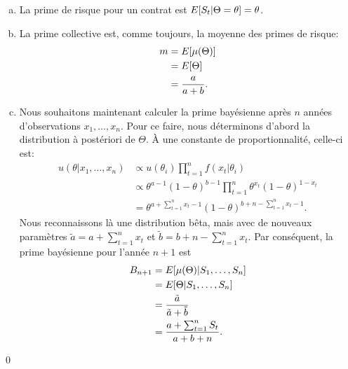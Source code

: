 \begin{exemple}
  \begin{enumerate}[a)]
  \item La prime de risque pour un contrat est
    $E [ S_t|\Theta = \theta ] = \theta$.
  \item La prime collective est, comme toujours, la moyenne des primes
    de risque:
    \begin{align*}
      m
      &= E [ \mu(\Theta) ] \\
      &= E [ \Theta ] \\
      &= \frac{a}{a + b}.
    \end{align*}
  \item Nous souhaitons maintenant calculer la prime bayésienne après
    $n$ années d'observations $x_1, \dots, x_n$. Pour ce faire, nous
    déterminons d'abord la distribution à postériori de $\Theta$. À
    une constante de proportionnalité, celle-ci est:
    \begin{align*}
      u(\theta|x_1, \dots, x_n)
      &\propto
        u(\theta_i) \prod_{t = 1}^n f(x_t|\theta_i) \\
      &\propto \theta^{a - 1} (1 - \theta)^{b - 1}
        \prod_{t = 1}^n \theta^{x_t} (1 - \theta)^{1 - x_t} \\
      &= \theta^{a + \sum_{t = 1}^n x_t - 1} (1 - \theta)^{b +
        n - \sum_{t = 1}^n x_t - 1}.
    \end{align*}
    Nous reconnaissons là une distribution bêta, mais avec de nouveaux
    paramètres $\tilde{a} = a + \sum_{t = 1}^n x_t$ et
    $\tilde{b} = b + n - \sum_{t = 1}^n x_t$. Par conséquent,
    la prime bayésienne pour l'année $n + 1$ est
    \begin{align*}
      B_{n + 1}
      &= E [ \mu(\Theta)|S_1, \dots, S_n ] \\
      &= E [ \Theta|S_1, \dots, S_n ] \\
      &= \frac{\tilde{a}}{\tilde{a} + \tilde{b}} \\
      &= \frac{a + \sum_{t = 1}^n S_t}{a + b + n}.
    \end{align*}
  \end{enumerate}
  \qed
\end{exemple}

